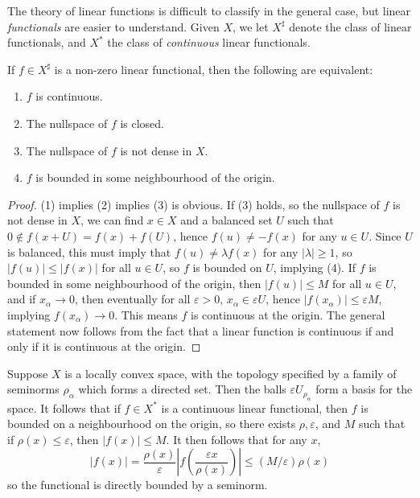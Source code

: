 The theory of linear functions is difficult to classify in the general case, but linear {\it functionals} are easier to understand. Given $X$, we let $X^\sharp$ denote the class of linear functionals, and $X^*$ the class of {\it continuous} linear functionals.

\begin{theorem}
    If $f \in X^\sharp$ is a non-zero linear functional, then the following are equivalent:
    \begin{enumerate}
        \item $f$ is continuous.
        \item The nullspace of $f$ is closed.
        \item The nullspace of $f$ is not dense in $X$.
        \item $f$ is bounded in some neighbourhood of the origin.
    \end{enumerate}
\end{theorem}
\begin{proof}
    (1) implies (2) implies (3) is obvious. If (3) holds, so the nullspace of $f$ is not dense in $X$, we can find $x \in X$ and a balanced set $U$ such that $0 \not \in f(x + U) = f(x) + f(U)$, hence $f(u) \neq - f(x)$ for any $u \in U$. Since $U$ is balanced, this must imply that $f(u) \neq \lambda f(x)$ for any $|\lambda| \geq 1$, so $|f(u)| \leq |f(x)|$ for all $u \in U$, so $f$ is bounded on $U$, implying (4). If $f$ is bounded in some neighbourhood of the origin, then $|f(u)| \leq M$ for all $u \in U$, and if $x_\alpha \to 0$, then eventually for all $\varepsilon > 0$, $x_\alpha \in \varepsilon U$, hence $|f(x_\alpha)| \leq \varepsilon M$, implying $f(x_\alpha) \to 0$. This means $f$ is continuous at the origin. The general statement now follows from the fact that a linear function is continuous if and only if it is continuous at the origin.
\end{proof}

\begin{example}
    Suppose $X$ is a locally convex space, with the topology specified by a family of seminorms $\rho_\alpha$ which forms a directed set. Then the balls $\varepsilon U_{\rho_\alpha}$ form a basis for the space. It follows that if $f \in X^*$ is a continuous linear functional, then $f$ is bounded on a neighbourhood on the origin, so there exists $\rho, \varepsilon$, and $M$ such that if $\rho(x) \leq \varepsilon$, then $|f(x)| \leq M$. It then follows that for any $x$,
    \[ |f(x)| = \frac{\rho(x)}{\varepsilon} \left| f \left( \frac{\varepsilon x}{\rho(x)} \right) \right| \leq (M/\varepsilon) \rho(x) \]
    so the functional is directly bounded by a seminorm.
\end{example}

